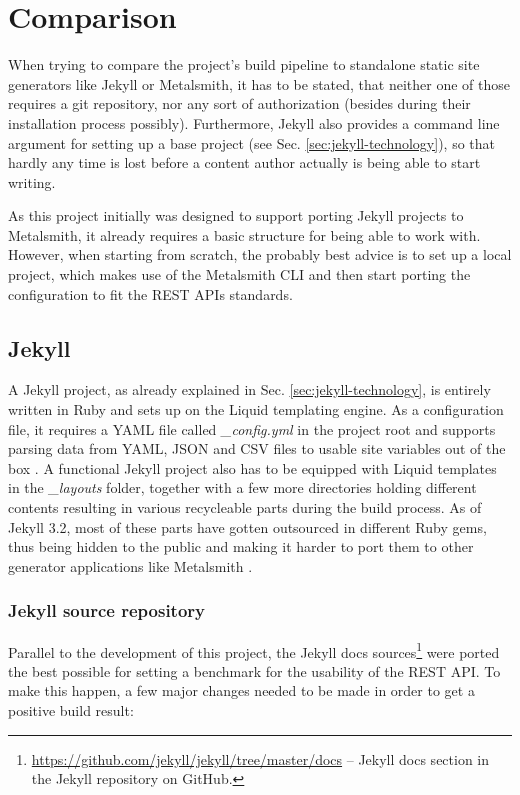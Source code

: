 \section{Comparison}
\label{sec:projectcomparison}

When trying to compare the project's build pipeline to standalone static site generators like Jekyll or Metalsmith, it has to be stated, that neither one of those requires a git repository, nor any sort of authorization (besides during their installation process possibly). Furthermore, Jekyll also provides a command line argument for setting up a base project (see Sec. \ref{sec:jekyll-technology}), so that hardly any time is lost before a content author actually is being able to start writing.

As this project initially was designed to support porting Jekyll projects to Metalsmith, it already requires a basic structure for being able to work with. However, when starting from scratch, the probably best advice is to set up a local project, which makes use of the Metalsmith CLI and then start porting the configuration to fit the REST APIs standards.

\subsection{Jekyll}
A Jekyll project, as already explained in Sec. \ref{sec:jekyll-technology}, is entirely written in Ruby and sets up on the Liquid templating engine. As a configuration file, it requires a YAML file called \emph{\_config.yml} in the project root and supports parsing data from YAML, JSON and CSV files to usable site variables out of the box \cite[76]{dhillon2016}. A functional Jekyll project also has to be equipped with Liquid templates in the \emph{\_layouts} folder, together with a few more directories holding different contents resulting in various recycleable parts during the build process. As of Jekyll 3.2, most of these parts have gotten outsourced in different Ruby gems, thus being hidden to the public and making it harder to port them to other generator applications like Metalsmith \cite{JekyllDirectoryStructure}.

\subsubsection{Jekyll source repository}
Parallel to the development of this project, the Jekyll docs sources\footnote{\url{https://github.com/jekyll/jekyll/tree/master/docs} -- Jekyll docs section in the Jekyll repository on GitHub.} were ported the best possible for setting a benchmark for the usability of the REST API. To make this happen, a few major changes needed to be made in order to get a positive build result:

